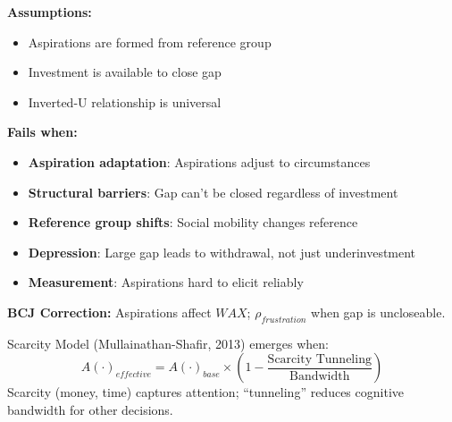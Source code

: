 \begin{tcolorbox}[colback=red!5!white, colframe=red!75!black, title=Boundary Condition: Where Aspirations Model Fails]
\textbf{Assumptions:}
\begin{itemize}[nosep]
\item Aspirations are formed from reference group
\item Investment is available to close gap
\item Inverted-U relationship is universal
\end{itemize}

\textbf{Fails when:}
\begin{itemize}[nosep]
\item \textbf{Aspiration adaptation}: Aspirations adjust to circumstances
\item \textbf{Structural barriers}: Gap can't be closed regardless of investment
\item \textbf{Reference group shifts}: Social mobility changes reference
\item \textbf{Depression}: Large gap leads to withdrawal, not just underinvestment
\item \textbf{Measurement}: Aspirations hard to elicit reliably
\end{itemize}

\textbf{BCJ Correction:} Aspirations affect $WAX$; $\rho_{frustration}$ when gap is uncloseable.
\end{tcolorbox}


\begin{theorem}
\label{thm:scarcity-bandwidth}
Scarcity Model (Mullainathan-Shafir, 2013) emerges when:
\begin{equation}
\boxed{A(\cdot)_{effective} = A(\cdot)_{base} \times \left(1 - \frac{\text{Scarcity Tunneling}}{\text{Bandwidth}}\right)}
\end{equation}
Scarcity (money, time) captures attention; ``tunneling'' reduces cognitive bandwidth for other decisions.
\end{theorem}

